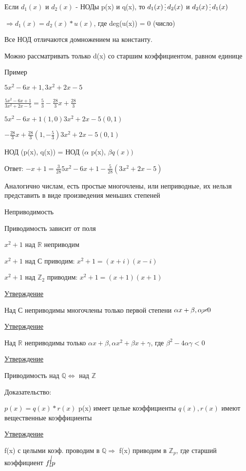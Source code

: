 \documentclass{article}
\begin{document}
Если $d_1(x)$ и $d_2(x)$ - НОДы p(x) и q(x), то $d_1(x)\mathop{\raisebox{-2pt}{\vdots}} d_2(x)$ и $d_2(x)\mathop{\raisebox{-2pt}{\vdots}} d_1(x)$

$\Rightarrow d_1(x) = d_2(x) \ast u(x)$, где deg(u(x)) = 0 (число)

Все НОД отличаются домножением на константу.

Можно рассматривать только d(x) со старшим коэффициентом, равном единице

Пример

$5x^2-6x+1, 3x^2+2x-5$

$\frac{5x^2-6x+1}{3x^2+2x-5} = \frac{5}{3} - \frac{28}{3}x + \frac{28}{3} $

$5x^2-6x+1 (1, 0) 3x^2+2x-5 (0, 1)$

$- \frac{28}{3}x + \frac{28}{3} (1, - \frac{5}{3}) 3x^2+2x-5 (0, 1)$

НОД (p(x), q(x)) = НОД ($\alpha$ p(x), $\beta q(x))$

Ответ: $-x+1 = \frac{3}{28}5x^2-6x+1 - \frac{5}{28}(3x^2+2x-5)$

Аналогично числам, есть простые многочлены, или неприводные, их нельзя представить в виде произведения меньших степеней

Неприводимость 

Приводимость зависит от поля 

$x^2+1$ над $\mathbb {R}$ неприводим

$x^2+1$ над С приводим: $x^2+1 = (x+i)(x-i)$

$x^2+1$ над $\mathbb {Z}_2$ приводим: $x^2+1 = (x+1)(x+1)$

\underline{Утверждение}

Над С неприводимы многочлены только первой степени $\alpha x + \beta, \alpha \cancel = 0$

\underline{Утверждение}

Над $\mathbb {R}$ неприводимы только $\alpha x + \beta, \alpha x^2 + \beta x + \gamma$, где $\beta^2 - 4 \alpha \gamma < 0$

\underline{Утверждение}

Приводимость над $\mathbb {Q} \Leftrightarrow$ над $\mathbb {Z}$

Доказательство:

$p(x) = q(x) \ast r(x)$
p(x) имеет целые коэффициенты
$q(x), r(x)$ имеют вещественные коэффициенты

\underline{Утверждение}

f(x) с целыми коэф. проводим в $\mathbb {Q} \Rightarrow $ f(x) приводим в $\mathbb {Z}_p$, где старший коэффициент $f  \cancel{ \mathop{\raisebox{-2pt}{\vdots}}} p$ 
\end{document}
